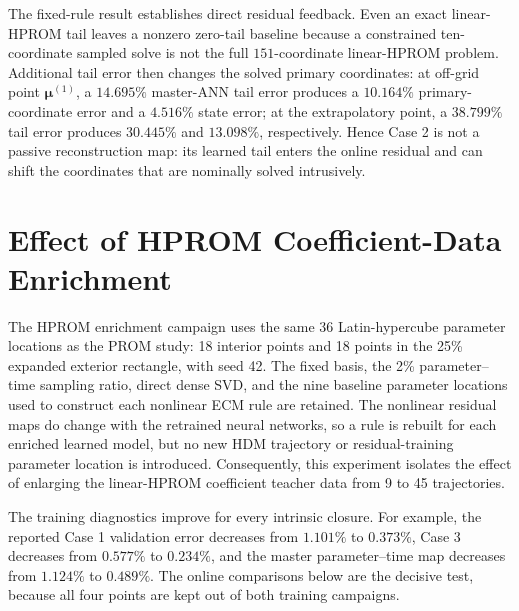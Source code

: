 \documentclass[11pt]{article}
\newcommand{\mub}{\bm\mu}
\begin{document}
The fixed-rule result establishes direct residual feedback.  Even an exact linear-HPROM tail leaves a nonzero zero-tail baseline because a constrained ten-coordinate sampled solve is not the full $151$-coordinate linear-HPROM problem.  Additional tail error then changes the solved primary coordinates: at off-grid point $\mub^{(1)}$, a $14.695\%$ master-ANN tail error produces a $10.164\%$ primary-coordinate error and a $4.516\%$ state error; at the extrapolatory point, a $38.799\%$ tail error produces $30.445\%$ and $13.098\%$, respectively.  Hence Case 2 is not a passive reconstruction map: its learned tail enters the online residual and can shift the coordinates that are nominally solved intrusively.

\section{Effect of HPROM Coefficient-Data Enrichment}
The HPROM enrichment campaign uses the same 36 Latin-hypercube parameter locations as the PROM study: 18 interior
points and 18 points in the 25\% expanded exterior rectangle, with seed 42.  The fixed basis, the 2\%
parameter--time sampling ratio, direct dense SVD, and the nine baseline parameter locations used to construct each
nonlinear ECM rule are retained.  The nonlinear residual maps do change with the retrained neural networks, so a
rule is rebuilt for each enriched learned model, but no new HDM trajectory or residual-training parameter location
is introduced.  Consequently, this experiment isolates the effect of enlarging the linear-HPROM coefficient teacher
data from 9 to 45 trajectories.

\begin{table}[H]
\centering
\caption{Reported coefficient-space training and validation errors for the HPROM learned maps before and after
coefficient-data enrichment.  Values are relative Frobenius percentages.  The baseline records use their original
internal held-out snapshot split; the enriched master-map record uses the two separate validation trajectories, so
the validation columns are useful diagnostics but are not a strictly paired model-selection protocol.}
\label{tab:hprom-enrichment-training}
\resizebox{0.94\textwidth}{!}{}
\end{table}

The training diagnostics improve for every intrinsic closure.  For example, the reported Case 1 validation error
decreases from \(1.101\%\) to \(0.373\%\), Case 3 decreases from \(0.577\%\) to \(0.234\%\), and the master
parameter--time map decreases from \(1.124\%\) to \(0.489\%\).  The online comparisons below are the decisive
test, because all four points are kept out of both training campaigns.
\end{document}
